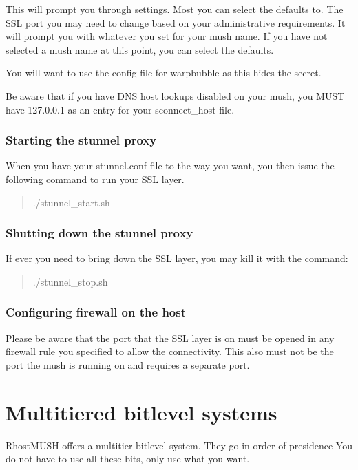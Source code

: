 \documentclass[letterpaper,10pt,english]{sphinxmanual}
\begin{document}
\sphinxAtStartPar
This will prompt you through settings.  Most you can select the defaults to.
The SSL port you may need to change based on your administrative requirements.
It will prompt you with whatever you set for your mush name.  If you have not
selected a mush name at this point, you can select the defaults.

\sphinxAtStartPar
You will want to use the config file for warpbubble as this hides the secret.

\sphinxAtStartPar
Be aware that if you have DNS host lookups disabled on your mush, you
MUST have 127.0.0.1 as an entry for your sconnect\_host file.


\subsection{Starting the stunnel proxy}
\label{\detokenize{14-ssl:starting-the-stunnel-proxy}}
\sphinxAtStartPar
When you have your stunnel.conf file to the way you want, you then
issue the following command to run your SSL layer.
\begin{quote}

\sphinxAtStartPar
./stunnel\_start.sh
\end{quote}


\subsection{Shutting down the stunnel proxy}
\label{\detokenize{14-ssl:shutting-down-the-stunnel-proxy}}
\sphinxAtStartPar
If ever you need to bring down the SSL layer, you may kill it with the command:
\begin{quote}

\sphinxAtStartPar
./stunnel\_stop.sh
\end{quote}


\subsection{Configuring firewall on the host}
\label{\detokenize{14-ssl:configuring-firewall-on-the-host}}
\sphinxAtStartPar
Please be aware that the port that the SSL layer is on must be opened
in any firewall rule you specified to allow the connectivity.  This also must
not be the port the mush is running on and requires a separate port.


\chapter{Multi\sphinxhyphen{}tiered bitlevel systems}
\label{\detokenize{15-bitlevels:multi-tiered-bitlevel-systems}}\label{\detokenize{15-bitlevels::doc}}
\sphinxAtStartPar
RhostMUSH offers a multi\sphinxhyphen{}tier bitlevel system.  They go in order of presidence
You do not have to use all these bits, only use what you want.
\end{document}
